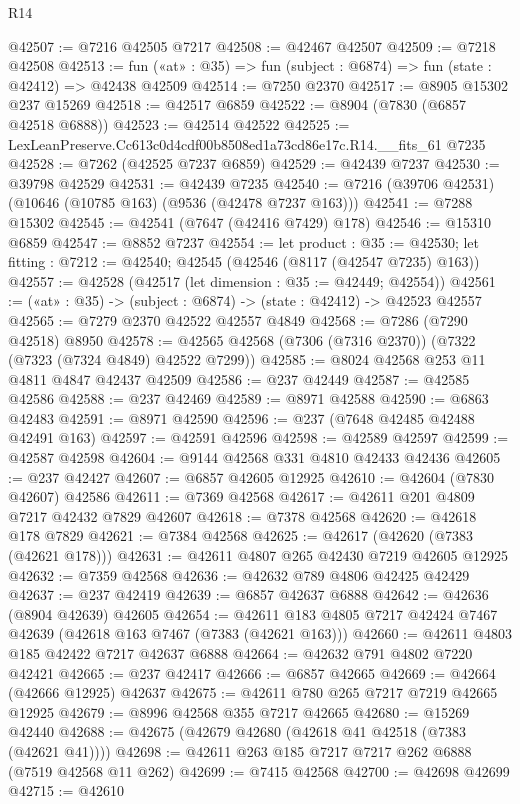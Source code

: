 \begin{lexlean}{R14}
\begin{coremodule}
@42507 := @7216 @42505 @7217
@42508 := @42467 @42507
@42509 := @7218 @42508
@42513 := fun («at» : @35) => fun (subject : @6874) => fun (state : @42412) => @42438 @42509
@42514 := @7250 @2370
@42517 := @8905 @15302 @237 @15269
@42518 := @42517 @6859
@42522 := @8904 (@7830 (@6857 @42518 @6888))
@42523 := @42514 @42522
@42525 := LexLeanPreserve.Cc613c0d4cdf00b8508ed1a73cd86e17c.R14.__fits_61 @7235
@42528 := @7262 (@42525 @7237 @6859)
@42529 := @42439 @7237
@42530 := @39798 @42529
@42531 := @42439 @7235
@42540 := @7216 (@39706 @42531) (@10646 (@10785 @163) (@9536 (@42478 @7237 @163)))
@42541 := @7288 @15302
@42545 := @42541 (@7647 (@42416 @7429) @178)
@42546 := @15310 @6859
@42547 := @8852 @7237
@42554 := let product : @35 := @42530;
  let fitting : @7212 := @42540; @42545 (@42546 (@8117 (@42547 @7235) @163))
@42557 := @42528 (@42517 (let dimension : @35 := @42449; @42554))
@42561 := («at» : @35) -> (subject : @6874) -> (state : @42412) -> @42523 @42557
@42565 := @7279 @2370 @42522 @42557 @4849
@42568 := @7286 (@7290 @42518) @8950
@42578 := @42565 @42568 (@7306 (@7316 @2370)) (@7322 (@7323 (@7324 @4849) @42522 @7299))
@42585 := @8024 @42568 @253 @11 @4811 @4847 @42437 @42509
@42586 := @237 @42449
@42587 := @42585 @42586
@42588 := @237 @42469
@42589 := @8971 @42588
@42590 := @6863 @42483
@42591 := @8971 @42590
@42596 := @237 (@7648 @42485 @42488 @42491 @163)
@42597 := @42591 @42596
@42598 := @42589 @42597
@42599 := @42587 @42598
@42604 := @9144 @42568 @331 @4810 @42433 @42436
@42605 := @237 @42427
@42607 := @6857 @42605 @12925
@42610 := @42604 (@7830 @42607) @42586
@42611 := @7369 @42568
@42617 := @42611 @201 @4809 @7217 @42432 @7829 @42607
@42618 := @7378 @42568
@42620 := @42618 @178 @7829
@42621 := @7384 @42568
@42625 := @42617 (@42620 (@7383 (@42621 @178)))
@42631 := @42611 @4807 @265 @42430 @7219 @42605 @12925
@42632 := @7359 @42568
@42636 := @42632 @789 @4806 @42425 @42429
@42637 := @237 @42419
@42639 := @6857 @42637 @6888
@42642 := @42636 (@8904 @42639) @42605
@42654 := @42611 @183 @4805 @7217 @42424 @7467 @42639 (@42618 @163 @7467 (@7383 (@42621 @163)))
@42660 := @42611 @4803 @185 @42422 @7217 @42637 @6888
@42664 := @42632 @791 @4802 @7220 @42421
@42665 := @237 @42417
@42666 := @6857 @42665
@42669 := @42664 (@42666 @12925) @42637
@42675 := @42611 @780 @265 @7217 @7219 @42665 @12925
@42679 := @8996 @42568 @355 @7217 @42665
@42680 := @15269 @42440
@42688 := @42675 (@42679 @42680 (@42618 @41 @42518 (@7383 (@42621 @41))))
@42698 := @42611 @263 @185 @7217 @7217 @262 @6888 (@7519 @42568 @11 @262)
@42699 := @7415 @42568
@42700 := @42698 @42699
@42715 := @42610

\end{coremodule}
\end{lexlean}
